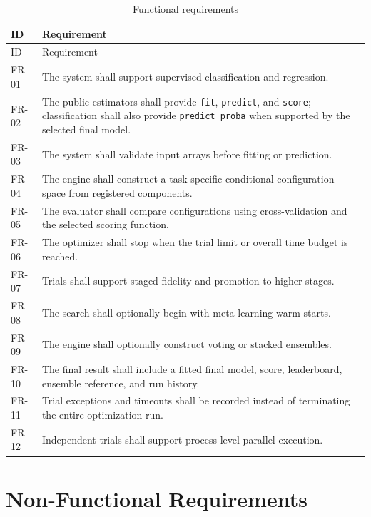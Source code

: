 \documentclass[12pt,a4paper,oneside]{report}
\begin{document}
\begin{longtable}{p{}p{}}
\caption{Functional requirements}\label{tab:functional-requirements}\\
\toprule
ID & Requirement \\
\midrule
\endfirsthead
\toprule
ID & Requirement \\
\midrule
\endhead
FR-01 & The system shall support supervised classification and regression. \\
FR-02 & The public estimators shall provide \texttt{fit}, \texttt{predict}, and
        \texttt{score}; classification shall also provide
        \texttt{predict\_proba} when supported by the selected final model. \\
FR-03 & The system shall validate input arrays before fitting or prediction. \\
FR-04 & The engine shall construct a task-specific conditional configuration
        space from registered components. \\
FR-05 & The evaluator shall compare configurations using cross-validation and
        the selected scoring function. \\
FR-06 & The optimizer shall stop when the trial limit or overall time budget is
        reached. \\
FR-07 & Trials shall support staged fidelity and promotion to higher stages. \\
FR-08 & The search shall optionally begin with meta-learning warm starts. \\
FR-09 & The engine shall optionally construct voting or stacked ensembles. \\
FR-10 & The final result shall include a fitted final model, score,
        leaderboard, ensemble reference, and run history. \\
FR-11 & Trial exceptions and timeouts shall be recorded instead of terminating
        the entire optimization run. \\
FR-12 & Independent trials shall support process-level parallel execution. \\
\bottomrule
\end{longtable}

\section{Non-Functional Requirements}
\end{document}
